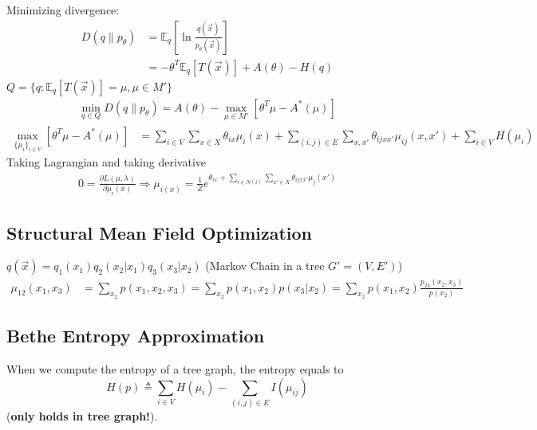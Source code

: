 \documentclass[11pt]{elegantbook}
\begin{document}
Minimizing divergence:
\begin{equation}
    \begin{aligned}
        D(q\| p_\theta)&=\mathbb{E}_q \left[\ln\frac{q(\vec{x})}{p_\theta(\vec{x})}\right]\\
        &=-\theta^T \mathbb{E}_q\left[T(\vec{x})\right]+A(\theta)-H(q)
    \end{aligned}
    \nonumber
\end{equation}
$Q=\{q:\mathbb{E}_q[T(\vec{x})]=\mu, \mu\in M'\}$
\begin{equation}
    \begin{aligned}
        \min_{q\in Q} D(q\| p_\theta)= A(\theta)-\max_{\mu\in M'} [\theta^T \mu-A^*(\mu)]
    \end{aligned}
    \nonumber
\end{equation}
\begin{equation}
    \begin{aligned}
        \max_{\{\mu_i\}_{i\in V}} [\theta^T \mu-A^*(\mu)]&=\sum_{i\in V} \sum_{x\in X}\theta_{ix}\mu_i(x)+\sum_{(i,j)\in E}\sum_{x,x'}\theta_{ijxx'}\mu_{ij}(x,x')+\sum_{i\in V}H(\mu_i)
    \end{aligned}
    \nonumber
\end{equation}
Taking Lagrangian and taking derivative
\begin{equation}
    \begin{aligned}
        0=\frac{\partial L(\mu,\lambda)}{\partial \mu_i(x)} \Rightarrow \mu_{i(x)}=\frac{1}{Z} e^{\theta_{ix}+\sum_{i\in N(i)}\sum_{x'\in X}\theta_{ijxx'}\mu_j(x')}
    \end{aligned}
    \nonumber
\end{equation}

\subsection{Structural Mean Field Optimization}
$q(\vec{x})=q_1(x_1)q_2(x_2|x_1)q_3(x_3|x_2)$ (Markov Chain in a tree $G'=(V,E')$)
\begin{equation}
    \begin{aligned}
        \mu_{12}(x_1,x_3)&=\sum_{x_2}p(x_1,x_2,x_3)=\sum_{x_2}p(x_1,x_2)p(x_3|x_2)=\sum_{x_2}p(x_1,x_2)\frac{p_{23}(x_2,x_3)}{p(x_2)}
    \end{aligned}
    \nonumber
\end{equation}

\subsection{Bethe Entropy Approximation}
When we compute the entropy of a tree graph, the entropy equals to
$$
H(p) \triangleq \sum_{i \in V} H\left(\mu_i\right)-\sum_{(i, j) \in E} I\left(\mu_{i j}\right)
$$
(\textbf{only holds in tree graph!}).
\end{document}
